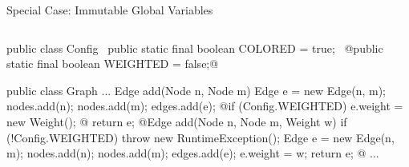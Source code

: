 \begin{frame}[fragile]{Special Case: Immutable Global Variables}
		\begin{columns}
\begin{tiny}
\begin{codetight}{}
public class Config {
	~public static final boolean COLORED = true;~
	@public static final boolean WEIGHTED = false;@
}
\end{codetight}
\begin{codetight}{}
public class Graph {
	...
	Edge add(Node n, Node m) {
		Edge e = new Edge(n, m);
		nodes.add(n); nodes.add(m); edges.add(e);
		@if (Config.WEIGHTED) { e.weight = new Weight(); }@
		return e;
	}
	@Edge add(Node n, Node m, Weight w) {
		if (!Config.WEIGHTED) { throw new RuntimeException(); }
		Edge e = new Edge(n, m);
		nodes.add(n); nodes.add(m); edges.add(e);
		e.weight = w;
		return e;
	}@
	...
}
\end{codetight}
\end{tiny}	
		\end{columns}
\end{frame}

